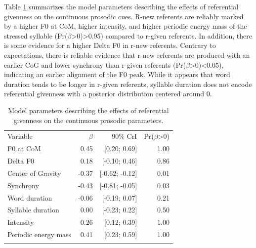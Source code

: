 Table \ref{table:model_parameters_referential_givenness} summarizes the model parameters describing the effects of referential givenness on the continuous prosodic cues. R-new referents are reliably marked by a higher F0 at CoM, higher intensity, and higher periodic energy mass of the stressed syllable (Pr($\beta$\textgreater{}0)\textgreater{}0.95) compared to r-given referents. In addition, there is some evidence for a higher Delta F0 in r-new referents. Contrary to expectations, there is reliable evidence that r-new referents are produced with an earlier CoG and lower synchrony than r-given referents (Pr($\beta$\textgreater{}0)\textless{}0.05), indicating an earlier alignment of the F0 peak. While it appears that word duration tends to be longer in r-given referents, syllable duration does not encode referential givenness with a posterior distribution centered around 0.

\begin{table}[]
\begin{tabular}{lrrr}
\lsptoprule
\multicolumn{4}{c}{Referential givenness} \\ \hline
Variable    & $\beta$ & 90\% CrI  & Pr($\beta$\textgreater{}0) \\ \hline
F0 at CoM    & 0.45       & {[}0.20; 0.69{]}  & 1.00                          \\
Delta F0    & 0.18       & {[}-0.10; 0.46{]}  & 0.86                          \\
Center of Gravity            & -0.37       & {[}-0.62; -0.12{]}  & 0.01                          \\
Synchrony            & -0.43       & {[}-0.81; -0.05{]}  & 0.03                          \\
Word duration            & -0.06       & {[}-0.19; 0.07{]}  & 0.21                          \\
Syllable duration & 0.00       & {[}-0.23; 0.22{]}  & 0.50                             \\
Intensity             & 0.26       & {[}0.12; 0.39{]} & 1.00                          \\
Periodic energy mass         & 0.41       & {[}0.23; 0.59{]} & 1.00                          \\
\lspbottomrule
\end{tabular}
\caption{Model parameters describing the effects of referential givenness on the continuous prosodic parameters.}
\label{table:model_parameters_referential_givenness}
\end{table}

